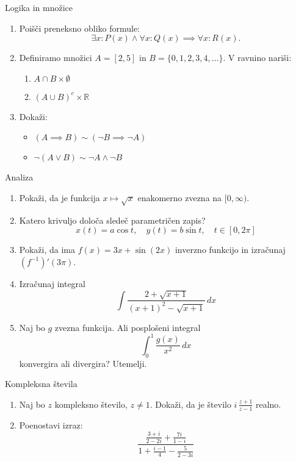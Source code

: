 \begin{frame}{Logika in množice}
    \begin{enumerate}
        \item
        Poišči preneksno obliko formule: 
        \[
        \exists x : P(x) \land \forall x : Q(x) \implies \forall x : R(x).
        \]
        \item 
        Definiramo množici $A = [2,5]$ in $B = \{0,1,2,3,4,\ldots\}$. V ravnino nariši:
        \begin{enumerate}
            \item $A \cap B \times \emptyset$
            \item $(A \cup B)^c \times \mathbb{R}$
        \end{enumerate}
        \item
        Dokaži:
        \begin{itemize}
            \item $(A \implies B) \sim (\neg B \implies \neg A)$
            \item $\neg (A \lor B) \sim \neg A \land \neg B$
        \end{itemize}
    \end{enumerate}
\end{frame}

\begin{frame}{Analiza}
    \begin{enumerate}
        \item Pokaži, da je funkcija \( x \mapsto \sqrt{x} \) enakomerno zvezna na \([0, \infty)\).
        \item Katero krivuljo določa sledeč parametričen zapis?
        \[
        x(t) = a \cos t, \quad y(t) = b \sin t, \quad t \in [0, 2\pi]
        \]
        \item Pokaži, da ima \( f(x) = 3x + \sin(2x) \) inverzno funkcijo in izračunaj \((f^{-1})'(3\pi)\).
        \item Izračunaj integral
        \[
        \int \frac{2 + \sqrt{x+1}}{(x+1)^2 - \sqrt{x+1}} \, dx
        \]
        \item Naj bo \( g \) zvezna funkcija. Ali posplošeni integral 
        \[
        \int_{0}^{1} \frac{g(x)}{x^2} \, dx
        \]
        konvergira ali divergira? Utemelji.
    \end{enumerate}
\end{frame}


\begin{frame}{Kompleksna števila}
    \begin{enumerate}
        \item
        Naj bo $z$ kompleksno število, $z \neq 1$. Dokaži, da je število $
        i \, \frac{z+1}{z-1}
        $
        realno.
        \item
        Poenostavi izraz:
        \[
        \frac{\frac{3+i}{2-2i}+\frac{7i}{1-i}}{1+\frac{i-1}{4}-\frac{5}{2-3i}}
        \]
    \end{enumerate}
\end{frame}
